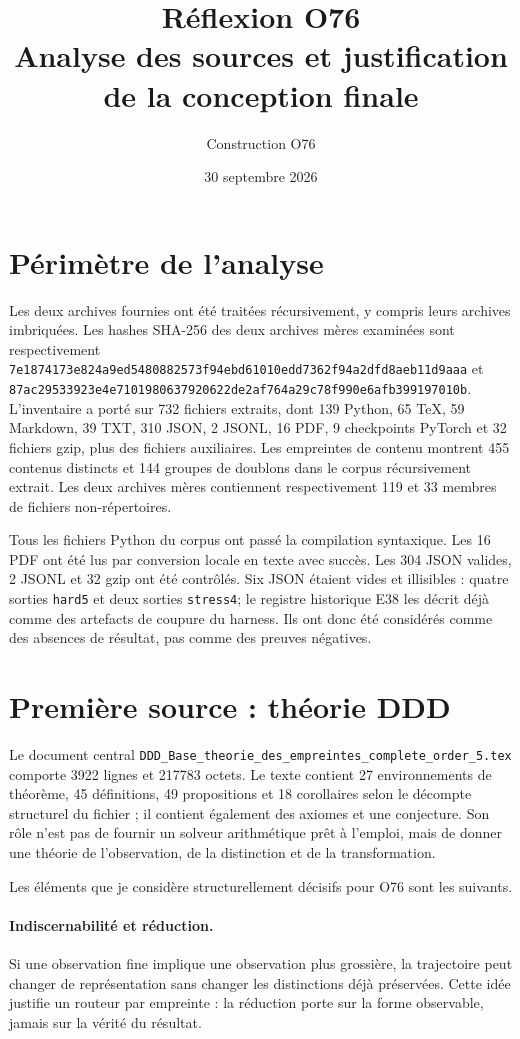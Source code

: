 \documentclass[11pt,a4paper]{article}
\title{Réflexion O76\\Analyse des sources et justification de la conception finale}
\author{Construction O76}
\date{30 septembre 2026}
\begin{document}
\maketitle
\tableofcontents

\section{Périmètre de l'analyse}
Les deux archives fournies ont été traitées récursivement, y compris leurs archives imbriquées. Les hashes SHA-256 des deux archives mères examinées sont respectivement \texttt{7e1874173e824a9ed5480882573f94ebd61010edd7362f94a2dfd8aeb11d9aaa} et \texttt{87ac29533923e4e7101980637920622de2af764a29c78f990e6afb399197010b}.  L'inventaire a porté sur 732 fichiers extraits, dont 139 Python, 65 TeX, 59 Markdown, 39 TXT, 310 JSON, 2 JSONL, 16 PDF, 9 checkpoints PyTorch et 32 fichiers gzip, plus des fichiers auxiliaires. Les empreintes de contenu montrent 455 contenus distincts et 144 groupes de doublons dans le corpus récursivement extrait. Les deux archives mères contiennent respectivement 119 et 33 membres de fichiers non-répertoires.

Tous les fichiers Python du corpus ont passé la compilation syntaxique. Les 16 PDF ont été lus par conversion locale en texte avec succès. Les 304 JSON valides, 2 JSONL et 32 gzip ont été contrôlés. Six JSON étaient vides et illisibles : quatre sorties \texttt{hard5} et deux sorties \texttt{stress4}; le registre historique E38 les décrit déjà comme des artefacts de coupure du harness. Ils ont donc été considérés comme des absences de résultat, pas comme des preuves négatives.

\section{Première source : théorie DDD}
Le document central \texttt{DDD\_Base\_theorie\_des\_empreintes\_complete\_order\_5.tex} comporte 3922 lignes et 217783 octets. Le texte contient 27 environnements de théorème, 45 définitions, 49 propositions et 18 corollaires selon le décompte structurel du fichier ; il contient également des axiomes et une conjecture. Son rôle n'est pas de fournir un solveur arithmétique prêt à l'emploi, mais de donner une théorie de l'observation, de la distinction et de la transformation.

Les éléments que je considère structurellement décisifs pour O76 sont les suivants.

\paragraph{Indiscernabilité et réduction.} Si une observation fine implique une observation plus grossière, la trajectoire peut changer de représentation sans changer les distinctions déjà préservées. Cette idée justifie un routeur par empreinte : la réduction porte sur la forme observable, jamais sur la vérité du résultat.
\end{document}
